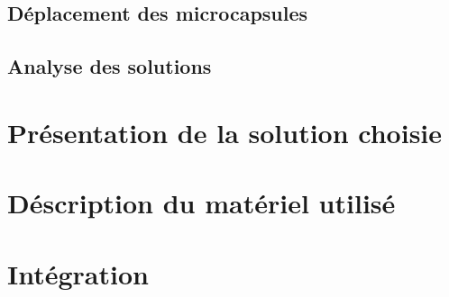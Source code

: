 \subsection{Déplacement des microcapsules}


\subsection{Analyse des solutions}
\section{Présentation de la solution choisie}
\section{Déscription du matériel utilisé}
\section{Intégration}